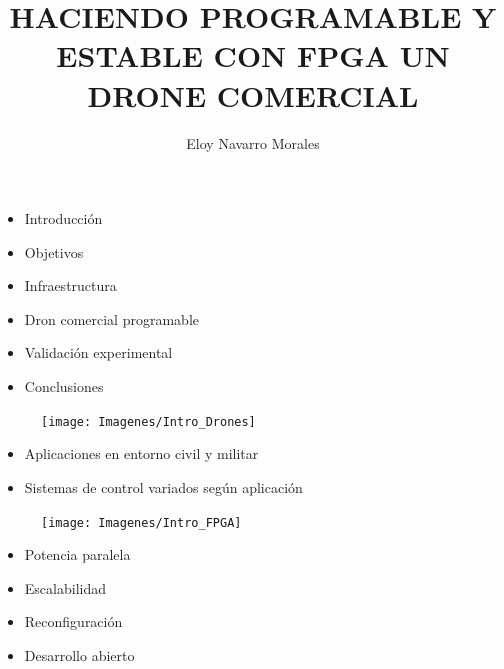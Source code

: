 \documentclass[a4,landscpae]{seminar}
\title{HACIENDO PROGRAMABLE Y ESTABLE CON FPGA UN DRONE COMERCIAL}
\author{Eloy Navarro Morales}
\begin{document}
\maketitle

\begin{hslide}
\begin{itemize}
	\item Introducci\'on
	\item Objetivos
	\item Infraestructura
	\item Dron comercial programable
	\item Validaci\'on experimental
	\item Conclusiones
\end{itemize}
\end{hslide}



\begin{hslide}
\begin{minipage}{6.1cm}
	\begin{figure}
		\texttt{[image: Imagenes/Intro\_Drones]}
	\end{figure}
\end{minipage} \hfill
\begin{minipage}{4.9cm}
	\begin{itemize}
		\item Aplicaciones en entorno civil y militar
		\item Sistemas de control variados seg\'un aplicaci\'on
	\end{itemize}
\end{minipage}

\end{hslide}
\begin{hslide}
\begin{minipage}{7cm}
	\begin{center}
		\begin{figure}
			\texttt{[image: Imagenes/Intro\_FPGA]}
		\end{figure}
	\end{center}
\end{minipage} \hfill
\begin{minipage}{3.5cm}
	\begin{itemize}
		\item Potencia paralela
		\item Escalabilidad
		\item Reconfiguraci\'on
		\item Desarrollo abierto
	\end{itemize}
\end{minipage}
\end{hslide}
\end{document}
